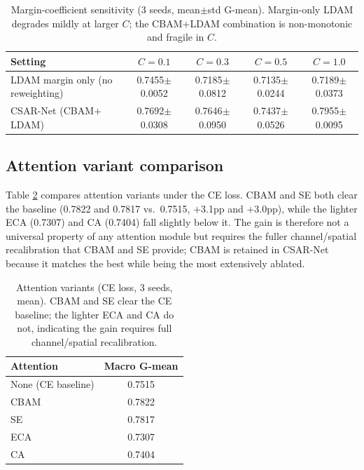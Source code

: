 \documentclass[a4paper,fleqn]{cas-sc}
\begin{document}
\begin{sloppypar}
	\begin{table}[pos=htbp]
		\footnotesize
		\caption{Margin-coefficient sensitivity (3 seeds, mean$\pm$std G-mean). Margin-only LDAM degrades mildly at larger $C$; the CBAM$+$LDAM combination is non-monotonic and fragile in $C$.}
		\label{tbl:ablC}
		\centering
		\begin{tabular}{lcccc}
			\hline
			\textbf{Setting} & $C=0.1$ & $C=0.3$ & $C=0.5$ & $C=1.0$ \\ \hline
			LDAM margin only (no reweighting) & 0.7455$\pm$0.0052 & 0.7185$\pm$0.0812 & 0.7135$\pm$0.0244 & 0.7189$\pm$0.0373 \\
			CSAR-Net (CBAM$+$LDAM) & 0.7692$\pm$0.0308 & 0.7646$\pm$0.0950 & 0.7437$\pm$0.0526 & 0.7955$\pm$0.0095 \\ \hline
		\end{tabular}
	\end{table}

	\subsection{Attention variant comparison}
	\label{sec:attn}
	\par{
		Table \ref{tbl:attn} compares attention variants under the CE loss. CBAM and SE both clear the baseline (0.7822 and 0.7817 vs.\ 0.7515, $+$3.1pp and $+$3.0pp), while the lighter ECA (0.7307) and CA (0.7404) fall slightly below it. The gain is therefore not a universal property of any attention module but requires the fuller channel/spatial recalibration that CBAM and SE provide; CBAM is retained in CSAR-Net because it matches the best while being the most extensively ablated.
	}

	\begin{table}[pos=htbp]
		\footnotesize
		\caption{Attention variants (CE loss, 3 seeds, mean). CBAM and SE clear the CE baseline; the lighter ECA and CA do not, indicating the gain requires full channel/spatial recalibration.}
		\label{tbl:attn}
		\centering
		\begin{tabular}{lc}
	\hline
	\textbf{Attention} & \textbf{Macro G-mean} \\ \hline
	None (CE baseline) & 0.7515 \\
	CBAM & 0.7822 \\
	SE & 0.7817 \\
	ECA & 0.7307 \\
	CA & 0.7404 \\
	\hline
	\end{tabular}
	\end{table}


\end{sloppypar}
\end{document}
